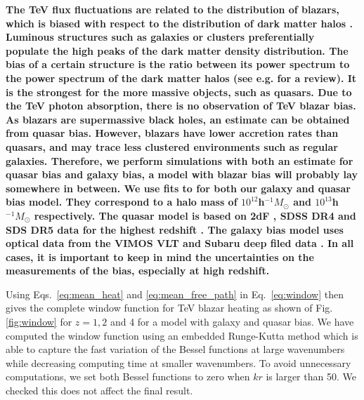 \documentclass[twocolumns]{emulateapj}
\newcommand\ALc[1]{{\color{red} \bf #1}} %
\begin{document}
\ALc{The TeV flux fluctuations are related to the distribution of blazars, which is biased with respect to the distribution of dark matter halos \citep{1996MNRAS.282..347M}. Luminous structures such as galaxies or clusters preferentially populate the high peaks of the dark matter density distribution.  The bias of a certain structure is the ratio between its power spectrum to the power spectrum of the dark matter halos (see e.g. \citep{2002PhR...372....1C} for a review). It is the strongest for the more massive objects, such as quasars. Due to the TeV photon absorption, there is no observation of  TeV blazar bias. As blazars are supermassive black holes, an estimate can be obtained from quasar bias. However, blazars have lower accretion rates than quasars, and may trace less clustered environments  such as regular galaxies. Therefore, we perform simulations with both an estimate for quasar bias and galaxy bias, a model with blazar bias will probably lay somewhere in between. We use fits to \citet{2008ApJ...678..627B} for both our galaxy and quasar bias model. They correspond to a halo mass of $10^{12}$h$^{-1} M_{\odot}$ and $10^{13}$h$^{-1}M_{\odot}$ respectively. The quasar model is based on 2dF \citep{2005MNRAS.356..415C}, SDSS DR4 \citep{2007ApJ...658...85M}  and SDS DR5 data for the highest redshift \citep{2007AJ....133.2222S}. The galaxy bias model uses optical data from the VIMOS VLT \citep{2005A&A...442..801M} and Subaru deep filed data \citep{2006ApJ...637..631K}. In all cases, it is important to keep in mind the uncertainties on the measurements of the bias, especially at high redshift.}


Using Eqs.~\ref{eq:mean_heat} and \ref{eq:mean_free_path} in Eq.~\ref{eq:window} then gives the complete window function for TeV blazar heating as shown of Fig. \ref{fig:window} for $z=1,2$ and 4 for a model with galaxy and quasar bias. We have computed the window function using an embedded Runge-Kutta method which is able to capture the fast variation of the Bessel functions at large wavenumbers while decreasing computing time at smaller wavenumbers. To avoid unnecessary computations, we set both Bessel functions to zero when $kr$ is larger than 50. We checked this does not affect the final result.
\end{document}
